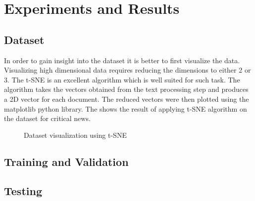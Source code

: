 \chapter{Experiments and Results} \label{result}

\section{Dataset}
In order to gain insight into the dataset it is better to first visualize the data. Visualizing high dimensional data requires reducing the dimensions to either 2 or 3. The t-SNE\cite{maaten2008visualizing} is an excellent algorithm which is well suited for such task. The algorithm takes the vectors obtained from the text processing step and produces a 2D vector for each document. The reduced vectors were then plotted using the matplotlib\cite{hunter2007matplotlib} python library. The  shows the result of applying t-SNE algorithm on the dataset for critical news.

\begin{figure}[h]
    \caption{Dataset visualization using t-SNE}
    \label{fig:dataset}
\end{figure}

\section{Training and Validation}

\section{Testing}